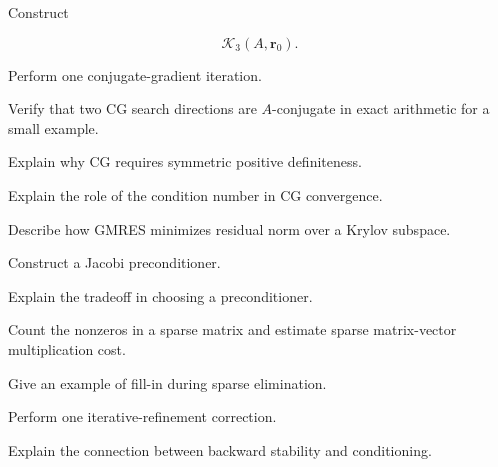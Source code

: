 \begin{exercise}[2]
Construct

\[
\mathcal{K}_3(A,\mathbf{r}_0).
\]
\end{exercise}

\begin{exercise}[3]
Perform one conjugate-gradient iteration.
\end{exercise}

\begin{exercise}[3]
Verify that two CG search directions are \(A\)-conjugate in exact
arithmetic for a small example.
\end{exercise}

\begin{exercise}[3]
Explain why CG requires symmetric positive definiteness.
\end{exercise}

\begin{exercise}[3]
Explain the role of the condition number in CG convergence.
\end{exercise}

\begin{exercise}[3]
Describe how GMRES minimizes residual norm over a Krylov subspace.
\end{exercise}

\begin{exercise}[3]
Construct a Jacobi preconditioner.
\end{exercise}

\begin{exercise}[3]
Explain the tradeoff in choosing a preconditioner.
\end{exercise}

\begin{exercise}[3]
Count the nonzeros in a sparse matrix and estimate sparse matrix-vector
multiplication cost.
\end{exercise}

\begin{exercise}[3]
Give an example of fill-in during sparse elimination.
\end{exercise}

\begin{exercise}[3]
Perform one iterative-refinement correction.
\end{exercise}

\begin{exercise}[3]
Explain the connection between backward stability and conditioning.
\end{exercise}

